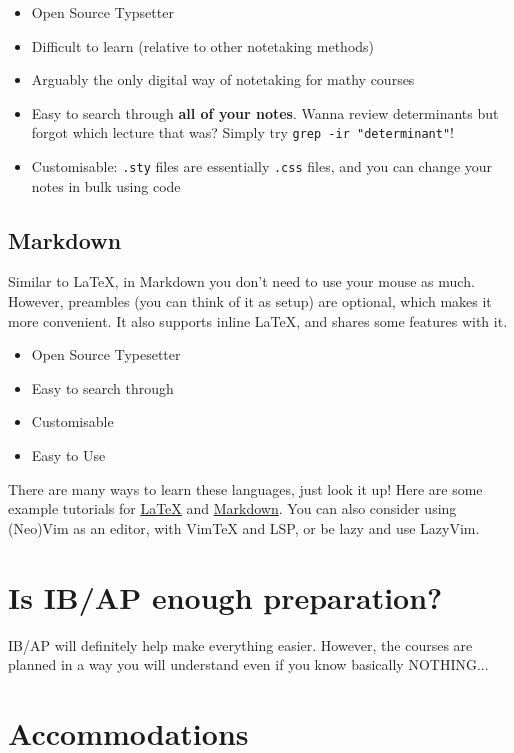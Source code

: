 \begin{itemize}
    \item Open Source Typsetter
    \item Difficult to learn (relative to other notetaking methods)
    \item Arguably the only digital way of notetaking for mathy courses
    \item Easy to search through \textbf{all of your notes}. Wanna review determinants but forgot which lecture that was? Simply try \verb|grep -ir "determinant"|!
    \item Customisable: \verb|.sty| files are essentially \verb|.css| files, and you can change your notes in bulk using code
\end{itemize}

\subsection{Markdown}

Similar to \LaTeX, in Markdown you don't need to use your mouse as much. However, preambles (you can think of it as setup) are optional, which makes it more convenient. It also supports inline \LaTeX, and shares some features with it.

\begin{itemize}
    \item Open Source Typesetter
    \item Easy to search through
    \item Customisable
    \item Easy to Use
\end{itemize}

There are many ways to learn these languages, just look it up! Here are some example tutorials for \href{https://www.overleaf.com/learn/latex/Learn_LaTeX_in_30_minutes}{\LaTeX} and \href{https://www.markdowntutorial.com/}{Markdown}. You can also consider using (Neo)Vim as an editor, with VimTeX and LSP, or be lazy and use LazyVim.

\section{Is IB/AP enough preparation?}

IB/AP will definitely help make everything easier. However, the courses are planned in a way you will understand even if you know basically NOTHING...

\section{Accommodations}

